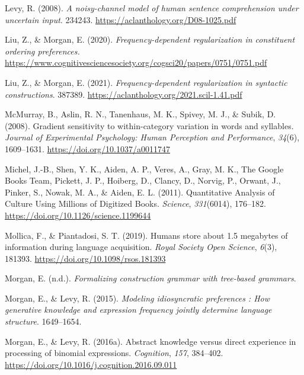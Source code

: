 \documentclass[
  12pt,
]{scrartcl}
\newlength{\cslhangindent}
\newenvironment{CSLReferences}[2] %
 {\begin{list}{}{%
  \setlength{\itemindent}{0pt}
  \setlength{\leftmargin}{0pt}
  \setlength{\parsep}{0pt}
  \ifodd #1
   \setlength{\leftmargin}{\cslhangindent}
   \setlength{\itemindent}{-1\cslhangindent}
  \fi
  \setlength{\itemsep}{#2\baselineskip}}}
 {\end{list}}
\begin{document}
\begin{CSLReferences}{1}{0}
Levy, R. (2008). \emph{A noisy-channel model of human sentence
comprehension under uncertain input}. 234243.
\url{https://aclanthology.org/D08-1025.pdf}

Liu, Z., \& Morgan, E. (2020). \emph{Frequency-dependent regularization
in constituent ordering preferences.}
\url{https://www.cognitivesciencesociety.org/cogsci20/papers/0751/0751.pdf}

Liu, Z., \& Morgan, E. (2021). \emph{Frequency-dependent regularization
in syntactic constructions}. 387389.
\url{https://aclanthology.org/2021.scil-1.41.pdf}

McMurray, B., Aslin, R. N., Tanenhaus, M. K., Spivey, M. J., \& Subik,
D. (2008). Gradient sensitivity to within-category variation in words
and syllables. \emph{Journal of Experimental Psychology: Human
Perception and Performance}, \emph{34}(6), 1609--1631.
\url{https://doi.org/10.1037/a0011747}

Michel, J.-B., Shen, Y. K., Aiden, A. P., Veres, A., Gray, M. K., The
Google Books Team, Pickett, J. P., Hoiberg, D., Clancy, D., Norvig, P.,
Orwant, J., Pinker, S., Nowak, M. A., \& Aiden, E. L. (2011).
Quantitative Analysis of Culture Using Millions of Digitized Books.
\emph{Science}, \emph{331}(6014), 176--182.
\url{https://doi.org/10.1126/science.1199644}

Mollica, F., \& Piantadosi, S. T. (2019). Humans store about 1.5
megabytes of information during language acquisition. \emph{Royal
Society Open Science}, \emph{6}(3), 181393.
\url{https://doi.org/10.1098/rsos.181393}

Morgan, E. (n.d.). \emph{Formalizing construction grammar with
tree-based grammars}.

Morgan, E., \& Levy, R. (2015). \emph{Modeling idiosyncratic preferences
: How generative knowledge and expression frequency jointly determine
language structure}. 1649--1654.

Morgan, E., \& Levy, R. (2016a). Abstract knowledge versus direct
experience in processing of binomial expressions. \emph{Cognition},
\emph{157}, 384--402.
\url{https://doi.org/10.1016/j.cognition.2016.09.011}


\end{CSLReferences}
\end{document}
